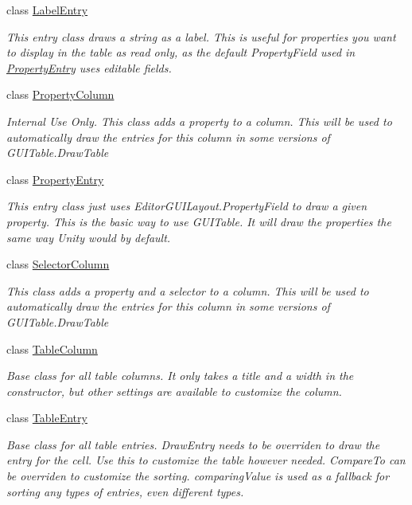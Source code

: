 \begin{DoxyCompactItemize}
class \mbox{\hyperlink{class_editor_g_u_i_table_1_1_label_entry}{Label\+Entry}}
\begin{DoxyCompactList}\small\item\em This entry class draws a string as a label. This is useful for properties you want to display in the table as read only, as the default Property\+Field used in \mbox{\hyperlink{class_editor_g_u_i_table_1_1_property_entry}{Property\+Entry}} uses editable fields. \end{DoxyCompactList}\item 
class \mbox{\hyperlink{class_editor_g_u_i_table_1_1_property_column}{Property\+Column}}
\begin{DoxyCompactList}\small\item\em Internal Use Only. This class adds a property to a column. This will be used to automatically draw the entries for this column in some versions of G\+U\+I\+Table.\+Draw\+Table \end{DoxyCompactList}\item 
class \mbox{\hyperlink{class_editor_g_u_i_table_1_1_property_entry}{Property\+Entry}}
\begin{DoxyCompactList}\small\item\em This entry class just uses Editor\+G\+U\+I\+Layout.\+Property\+Field to draw a given property. This is the basic way to use G\+U\+I\+Table. It will draw the properties the same way Unity would by default. \end{DoxyCompactList}\item 
class \mbox{\hyperlink{class_editor_g_u_i_table_1_1_selector_column}{Selector\+Column}}
\begin{DoxyCompactList}\small\item\em This class adds a property and a selector to a column. This will be used to automatically draw the entries for this column in some versions of G\+U\+I\+Table.\+Draw\+Table \end{DoxyCompactList}\item 
class \mbox{\hyperlink{class_editor_g_u_i_table_1_1_table_column}{Table\+Column}}
\begin{DoxyCompactList}\small\item\em Base class for all table columns. It only takes a title and a width in the constructor, but other settings are available to customize the column. \end{DoxyCompactList}\item 
class \mbox{\hyperlink{class_editor_g_u_i_table_1_1_table_entry}{Table\+Entry}}
\begin{DoxyCompactList}\small\item\em Base class for all table entries. Draw\+Entry needs to be overriden to draw the entry for the cell. Use this to customize the table however needed. Compare\+To can be overriden to customize the sorting. comparing\+Value is used as a fallback for sorting any types of entries, even different types. \end{DoxyCompactList}\end{DoxyCompactItemize}

